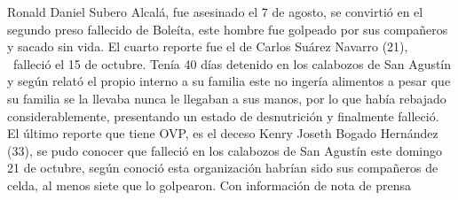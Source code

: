 \documentclass{article}%
\begin{document}
\newline%
%
Ronald Daniel Subero Alcalá, fue asesinado el 7 de agosto, se convirtió en el segundo preso fallecido de Boleíta, este hombre fue golpeado por sus compañeros y sacado sin vida.%
\newline%
%
El cuarto reporte fue el de Carlos Suárez Navarro (21), ~falleció el 15 de octubre. Tenía 40 días detenido en los calabozos de San Agustín y según relató el propio interno a su familia este no ingería alimentos a pesar que su familia se la llevaba nunca le llegaban a sus manos, por lo que había rebajado considerablemente, presentando un estado de desnutrición y finalmente falleció.%
\newline%
%
El último reporte que tiene OVP, es el deceso Kenry Joseth Bogado Hernández (33), se pudo conocer que falleció en los calabozos de San Agustín este domingo 21 de octubre, según conoció esta organización habrían sido sus compañeros de celda, al menos siete que lo golpearon.%
\newline%
%
Con información de nota de prensa%
\newline%
%
\end{document}
